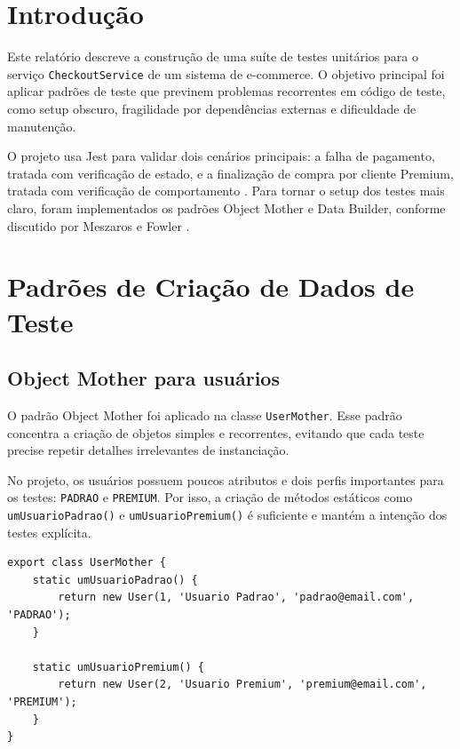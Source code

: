 \documentclass[
    12pt,
    openright,
    oneside,
    a4paper,
    chapter=TITLE,
    section=TITLE,
    brazil,
]{abntex2}
\begin{document}
\imprimircapa
\imprimirfolhaderosto

\tableofcontents*
\cleardoublepage

\textual

\chapter{Introdu\c{c}\~ao}

Este relat\'orio descreve a constru\c{c}\~ao de uma su\'ite de testes unit\'arios para o servi\c{c}o \texttt{CheckoutService} de um sistema de e-commerce. O objetivo principal foi aplicar padr\~oes de teste que previnem problemas recorrentes em c\'odigo de teste, como setup obscuro, fragilidade por depend\^encias externas e dificuldade de manuten\c{c}\~ao.

O projeto usa Jest para validar dois cen\'arios principais: a falha de pagamento, tratada com verifica\c{c}\~ao de estado, e a finaliza\c{c}\~ao de compra por cliente Premium, tratada com verifica\c{c}\~ao de comportamento \cite{jestMocks}. Para tornar o setup dos testes mais claro, foram implementados os padr\~oes Object Mother e Data Builder, conforme discutido por Meszaros \cite{xunitpatterns} e Fowler \cite{fowlerMocks}.

\chapter{Padr\~oes de Cria\c{c}\~ao de Dados de Teste}

\section{Object Mother para usu\'arios}

O padr\~ao Object Mother foi aplicado na classe \texttt{UserMother}. Esse padr\~ao concentra a cria\c{c}\~ao de objetos simples e recorrentes, evitando que cada teste precise repetir detalhes irrelevantes de instancia\c{c}\~ao.

No projeto, os usu\'arios possuem poucos atributos e dois perfis importantes para os testes: \texttt{PADRAO} e \texttt{PREMIUM}. Por isso, a cria\c{c}\~ao de m\'etodos est\'aticos como \texttt{umUsuarioPadrao()} e \texttt{umUsuarioPremium()} \'e suficiente e mant\'em a inten\c{c}\~ao dos testes expl\'icita.

\begin{lstlisting}[style=javascript,caption={Object Mother para usu\'arios}]
export class UserMother {
    static umUsuarioPadrao() {
        return new User(1, 'Usuario Padrao', 'padrao@email.com', 'PADRAO');
    }

    static umUsuarioPremium() {
        return new User(2, 'Usuario Premium', 'premium@email.com', 'PREMIUM');
    }
}
\end{lstlisting}
\end{document}
